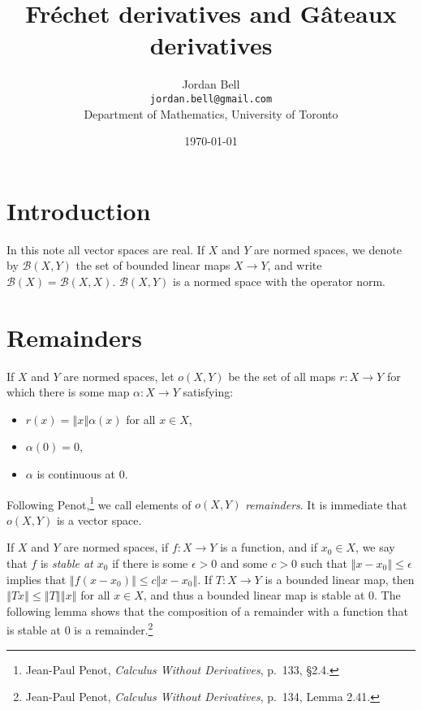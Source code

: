 \documentclass{article}
\newcommand{\norm}[1]{\left\Vert #1 \right\Vert}
\theoremstyle{definition}
\begin{document}
\title{Fr\'echet derivatives and G\^ateaux derivatives}
\author{Jordan Bell\\ \texttt{jordan.bell@gmail.com}\\Department of Mathematics, University of Toronto}
\date{\today}

\maketitle

\section{Introduction}
In this note all vector spaces are real.
 If $X$ and $Y$ are normed spaces,
we denote by $\mathscr{B}(X,Y)$ the set of bounded linear maps $X \to Y$, and write $\mathscr{B}(X)=\mathscr{B}(X,X)$.
$\mathscr{B}(X,Y)$ is a normed space with the operator norm.


\section{Remainders}
If $X$ and $Y$ are normed spaces, let $o(X,Y)$ be the set of all maps $r:X \to Y$ 
for which there is some map $\alpha:X \to Y$ satisfying:
\begin{itemize}
\item $r(x)=\norm{x}\alpha(x)$ for all $x \in X$,
\item $\alpha(0)=0$,
\item $\alpha$ is continuous at $0$.
\end{itemize}
Following
Penot,\footnote{Jean-Paul Penot, {\em Calculus Without Derivatives}, p.~133, \S 2.4.} we call elements of $o(X,Y)$ {\em remainders}.
It is immediate that $o(X,Y)$ is a vector space.

If $X$ and $Y$ are normed spaces, if $f:X \to Y$ is a function, and if $x_0 \in X$, we say that $f$ is {\em stable at $x_0$} if there is some
$\epsilon>0$ and some $c>0$ such that $\norm{x-x_0} \leq \epsilon$ implies that $\norm{f(x-x_0)} \leq c \norm{x-x_0}$.
If $T:X \to Y$ is a bounded linear map, then $\norm{Tx} \leq \norm{T} \norm{x}$ for all $x \in X$, and thus a bounded linear map
is stable at $0$. The following lemma shows that the composition of  a remainder with a function that is stable at $0$ is a remainder.\footnote{Jean-Paul
Penot, {\em Calculus Without Derivatives}, p.~134, Lemma 2.41.}
\end{document}
